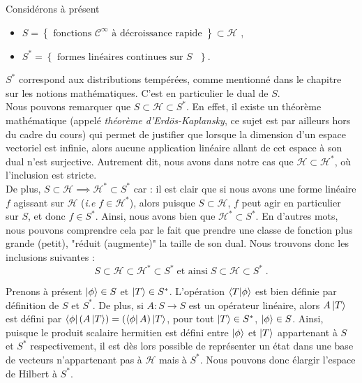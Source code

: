 \documentclass[../notesdecours]{subfiles}
\begin{document}
Considérons à présent
\begin{itemize}[label=\scriptsize$\blacksquare$]
    \item $S= \left\{ \mbox{ fonctions $\mathcal{C}^{\infty}$ à décroissance rapide } \right\} \subset \mathcal{H}$ ,
    \item $S^* = \left\{ \mbox{ formes linéaires continues sur $S$ } \right\} $.
\end{itemize}

$S^*$ correspond aux distributions tempérées, comme mentionné dans le chapitre sur les notions mathématiques. C'est en particulier le dual de $S$. \\


Nous pouvons remarquer que $S \subset \mathcal{H} \subset{S^*}$. En effet, il existe un théorème mathématique (appelé \textit{théorème d'Erdös-Kaplansky}, ce sujet est par ailleurs hors du cadre du cours) qui permet de justifier que lorsque la dimension d'un espace vectoriel est infinie, alors aucune application linéaire allant de cet espace à son dual n'est surjective. Autrement dit, nous avons dans notre cas que $\mathcal{H} \subset \mathcal{H}^*$, où l'inclusion est stricte. \\

De plus, $S \subset \mathcal{H} \implies \mathcal{H}^* \subset S^*$ car : il est clair que si nous avons une forme linéaire $f$ agissant sur $\mathcal{H}$ (\textit{i.e} $f \in \mathcal{H}^*$), alors puisque $S \subset \mathcal{H}$, $f$ peut agir en particulier sur $S$, et donc $f \in S^*$. Ainsi, nous avons bien que $\mathcal{H}^* \subset S^*$. En d'autres mots, nous pouvons comprendre cela par le fait que prendre une classe de fonction plus grande (petit), "réduit (augmente)" la taille de son dual. Nous trouvons donc les inclusions suivantes : $$S \subset \mathcal{H} \subset \mathcal{H}^* \subset S^* \; \text{et ainsi}\; S \subset \mathcal{H} \subset S^*\; .$$

Prenons à présent $\ket{\phi} \in S$ et $\ket{T} \in S^*$. L'opération $\braket{T|\phi}$ est bien définie par définition de $S$ et $S^*$. De plus, si $A : S \rightarrow S$ est un opérateur linéaire, alors $A \ket{T}$ est défini par $\bra{\phi}(A\ket{T}) = (\bra{\phi}A)\ket{T}$, pour tout $\ket{T} \in S^*$, $\ket{\phi} \in S$. Ainsi, puisque le produit scalaire hermitien est défini entre $\ket{\phi}$ et $\ket{T}$ appartenant à $S$ et $S^*$ respectivement, il est dès lors possible de représenter un état dans une base de vecteurs n'appartenant pas à $\mathcal{H}$ mais à $S^*$. Nous pouvons donc élargir l'espace de Hilbert à $S^*$. \\
\end{document}
